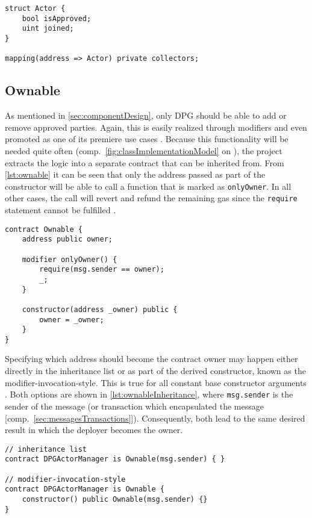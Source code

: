 \begin{lstlisting}[language=Solidity, caption=Declaration of approved agencies and Actor data structure, label=lst:actorStorage]
struct Actor {
	bool isApproved;
	uint joined;
}
    
mapping(address => Actor) private collectors;
\end{lstlisting}

\subsection{Ownable}
\label{sec:ownable}
As mentioned in \autoref{sec:componentDesign}, only \ac{DPG} should be able to add or remove approved parties. Again, this is easily realized through modifiers and even promoted as one of its premiere use cases \cite[p.~80]{solidityDocs}. Because this functionality will be needed quite often (comp.~\autoref{fig:classImplementationModel} on ), the project extracts the logic into a separate contract that can be inherited from. From \autoref{lst:ownable} it can be seen that only the address passed as part of the constructor will be able to call a function that is marked as \texttt{onlyOwner}. In all other cases, the call will revert and refund the remaining gas since the \texttt{require} statement cannot be fulfilled \cite[p.~75]{solidityDocs}. 

\begin{lstlisting}[language=Solidity, caption=Ownable contract, label=lst:ownable]
contract Ownable {
	address public owner;
	
	modifier onlyOwner() {
		require(msg.sender == owner);
		_;
	}
	
	constructor(address _owner) public {
		owner = _owner;
	}
}
\end{lstlisting}

Specifying which address should become the contract owner may happen either directly in the inheritance list or as part of the derived constructor, known as the modifier-invocation-style. This is true for all constant base constructor arguments \cite[p.~89]{solidityDocs}. Both options are shown in \autoref{lst:ownableInheritance}, where \texttt{msg.sender} is the sender of the message (or transaction which encapsulated the message [comp.~\ref{sec:messagesTransactions}]). Consequently, both lead to the same desired result in which the deployer becomes the owner.

\begin{lstlisting}[language=Solidity, caption=Inheriting from Ownable contract, label=lst:ownableInheritance]
// inheritance list
contract DPGActorManager is Ownable(msg.sender) { }

// modifier-invocation-style
contract DPGActorManager is Ownable { 
	constructor() public Ownable(msg.sender) {}
}
\end{lstlisting}

